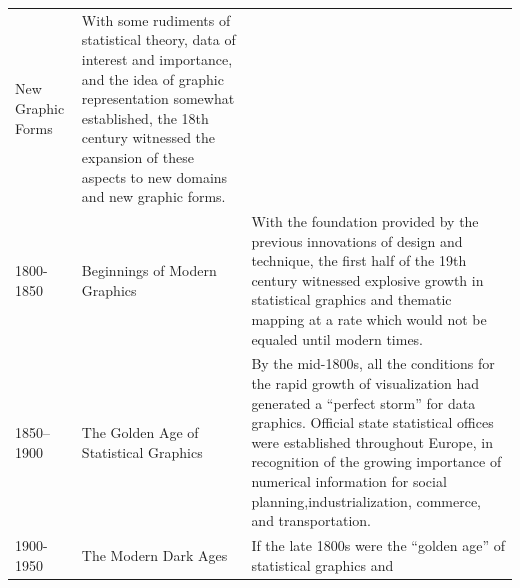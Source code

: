 \documentclass[]{book}
\theoremstyle{definition}
\theoremstyle{definition}
\theoremstyle{definition}
\theoremstyle{remark}
\begin{document}
\begin{longtable}[]{@{}lll@{}}
\begin{minipage}[t]{0.08\columnwidth}
New Graphic Forms\strut
\end{minipage} & \begin{minipage}[t]{0.76\columnwidth}\raggedright\strut
With some rudiments of statistical theory, data of interest and
importance, and the idea of graphic representation somewhat established,
the 18th century witnessed the expansion of these aspects to new domains
and new graphic forms.\strut
\end{minipage}\tabularnewline
\begin{minipage}[t]{0.07\columnwidth}\raggedright\strut
1800-1850\strut
\end{minipage} & \begin{minipage}[t]{0.08\columnwidth}\raggedright\strut
Beginnings of Modern Graphics\strut
\end{minipage} & \begin{minipage}[t]{0.76\columnwidth}\raggedright\strut
With the foundation provided by the previous innovations of design and
technique, the first half of the 19th century witnessed explosive growth
in statistical graphics and thematic mapping at a rate which would not
be equaled until modern times.\strut
\end{minipage}\tabularnewline
\begin{minipage}[t]{0.07\columnwidth}\raggedright\strut
1850--1900\strut
\end{minipage} & \begin{minipage}[t]{0.08\columnwidth}\raggedright\strut
The Golden Age of Statistical Graphics\strut
\end{minipage} & \begin{minipage}[t]{0.76\columnwidth}\raggedright\strut
By the mid-1800s, all the conditions for the rapid growth of
visualization had generated a ``perfect storm'' for data graphics.
Official state statistical offices were established throughout Europe,
in recognition of the growing importance of numerical information for
social planning,industrialization, commerce, and transportation.\strut
\end{minipage}\tabularnewline
\begin{minipage}[t]{0.07\columnwidth}\raggedright\strut
1900-1950\strut
\end{minipage} & \begin{minipage}[t]{0.08\columnwidth}\raggedright\strut
The Modern Dark Ages\strut
\end{minipage} & \begin{minipage}[t]{0.76\columnwidth}\raggedright\strut
If the late 1800s were the ``golden age'' of statistical graphics and

\end{minipage}
\end{longtable}
\end{document}
